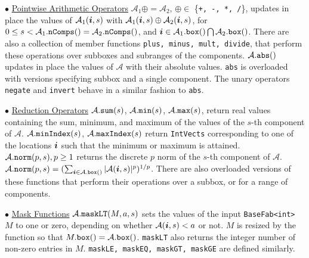 \begin{trivlist}
\item $\bullet$ \underline{Pointwise Arithmetic Operators}  
${\mathcal{A}_1} \oplus = {\mathcal{A}_2}$,
$\oplus \in $ \{{\tt{+, -, *, /}}\}, updates in place 
the values of ${\mathcal{A}}_1({\boldsymbol{i}}, s)$
with ${\mathcal{A}}_1({\boldsymbol{i}}, s) \oplus {\mathcal{A}}_2({\boldsymbol{i}}, s)$, 
for $0 \leq s <
{\mathcal{A}}_1.{\tt{nComps}}()={\mathcal{A}}_2.{\tt{nComps}}()$, and
$ {\boldsymbol{i}} \in {\mathcal{A}}_1.{\tt{box}}() \bigcap
{\mathcal{A}}_2.{\tt{box}}()$.  There are also a collection of member functions
{\tt{plus, minus, mult, divide}}, that perform these operations over
subboxes and subranges of the components.  ${\mathcal{A}}.{\tt{abs}}()$ updates in
place the values of ${\mathcal{A}}$ with their absolute values.  {\tt{abs}} is
overloaded with versions specifying subbox and a single component.
The unary operators {\tt negate} and {\tt invert} behave in a similar
fashion to {\tt abs}.

\item $\bullet$ \underline{Reduction Operators}  ${\mathcal{A}}.{\tt{sum}}(s)$,
${\mathcal{A}}.{\tt{min}}(s)$, ${\mathcal{A}}.{\tt{max}}(s)$, return real values containing the
sum, minimum, and maximum of the values of the $s$-th component of
${\mathcal{A}}$.  ${\mathcal{A}}.{\tt{minIndex}}(s)$, ${\mathcal{A}}.{\tt{maxIndex}}(s)$ return
{\tt{IntVects}} corresponding to one of the locations ${\boldsymbol{i}}$ such
that the minimum or maximum is attained.  ${\mathcal{A}}.{\tt{norm}}(p, s), p \geq 1$
returns the discrete $p$ norm of the $s$-th component of ${\mathcal{A}}$.
${\mathcal{A}}.{\tt{norm}}(p, s) = (\sum_{{\boldsymbol{i}} \in {\mathcal{A}}.{\tt{box}}()} | {\mathcal{A}}({\boldsymbol{i}}, s)
|^p)^{1/p}$.  There are also overloaded versions of these functions
that perform their operations over a subbox, or for a range of components.

\item $\bullet$ \underline{Mask Functions}  
${\mathcal{A}}.{\tt{maskLT}}(M, a, s)$
sets the values of the input {\tt BaseFab<int>} $M$ 
to one or zero, depending on whether ${\mathcal{A}}({\boldsymbol{i}}, s) <
a$ or not.  $M$ is resized by the function so that $M.{\tt{box}}() =
{\mathcal{A}}.{\tt{box}}()$.  {\tt{maskLT}} also returns the integer number of
non-zero entries in $M$.  {\tt{maskLE, maskEQ, maskGT, maskGE}} are
defined similarly.
\end{trivlist}

